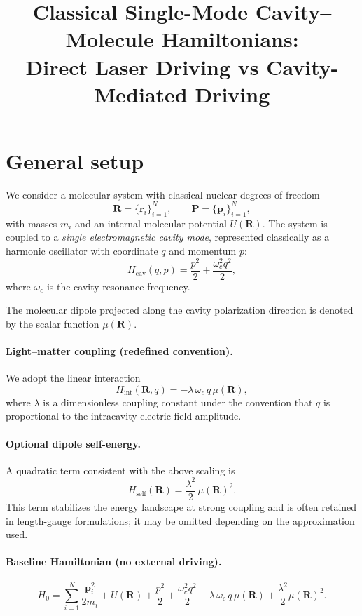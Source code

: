 \documentclass[11pt]{article}
\title{Classical Single-Mode Cavity--Molecule Hamiltonians:\\
Direct Laser Driving vs Cavity-Mediated Driving}
\author{}
\date{}
\begin{document}
\maketitle

\section{General setup}

We consider a molecular system with classical nuclear degrees of freedom
\[
\bm R=\{\bm r_i\}_{i=1}^N, \qquad
\bm P=\{\bm p_i\}_{i=1}^N,
\]
with masses $m_i$ and an internal molecular potential $U(\bm R)$.
The system is coupled to a \emph{single electromagnetic cavity mode}, represented
classically as a harmonic oscillator with coordinate $q$ and momentum $p$:
\begin{equation}
H_{\text{cav}}(q,p)=\frac{p^2}{2}+\frac{\omega_c^2 q^2}{2},
\end{equation}
where $\omega_c$ is the cavity resonance frequency.

The molecular dipole projected along the cavity polarization direction
is denoted by the scalar function $\mu(\bm R)$.

\paragraph{Light--matter coupling (redefined convention).}
We adopt the linear interaction
\begin{equation}
H_{\text{int}}(\bm R,q)= -\lambda\,\omega_c\, q\,\mu(\bm R),
\label{eq:Hint}
\end{equation}
where $\lambda$ is a dimensionless coupling constant under the convention
that $q$ is proportional to the intracavity electric-field amplitude.

\paragraph{Optional dipole self-energy.}
A quadratic term consistent with the above scaling is
\begin{equation}
H_{\text{self}}(\bm R)=\frac{\lambda^2}{2}\,\mu(\bm R)^2.
\label{eq:Hself}
\end{equation}
This term stabilizes the energy landscape at strong coupling and is often
retained in length-gauge formulations; it may be omitted depending on the
approximation used.

\paragraph{Baseline Hamiltonian (no external driving).}
\begin{equation}
H_0=
\sum_{i=1}^N \frac{\bm p_i^2}{2m_i}
+U(\bm R)
+\frac{p^2}{2}+\frac{\omega_c^2 q^2}{2}
-\lambda\,\omega_c\, q\,\mu(\bm R)
+\frac{\lambda^2}{2}\mu(\bm R)^2.
\label{eq:H0}
\end{equation}
\end{document}
